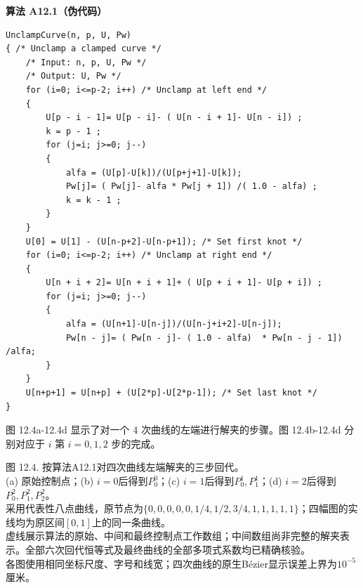 \documentclass[../main.tex]{subfiles}
\begin{document}
\par\medskip\noindent\textbf{算法 A12.1（伪代码）}\par
\begin{verbatim}
UnclampCurve(n, p, U, Pw)
{ /* Unclamp a clamped curve */
    /* Input: n, p, U, Pw */
    /* Output: U, Pw */
    for (i=0; i<=p-2; i++) /* Unclamp at left end */
    {
        U[p - i - 1]= U[p - i]- ( U[n - i + 1]- U[n - i]) ;
        k = p - 1 ;
        for (j=i; j>=0; j--)
        {
            alfa = (U[p]-U[k])/(U[p+j+1]-U[k]);
            Pw[j]= ( Pw[j]- alfa * Pw[j + 1]) /( 1.0 - alfa) ;
            k = k - 1 ;
        }
    }
    U[0] = U[1] - (U[n-p+2]-U[n-p+1]); /* Set first knot */
    for (i=0; i<=p-2; i++) /* Unclamp at right end */
    {
        U[n + i + 2]= U[n + i + 1]+ ( U[p + i + 1]- U[p + i]) ;
        for (j=i; j>=0; j--)
        {
            alfa = (U[n+1]-U[n-j])/(U[n-j+i+2]-U[n-j]);
            Pw[n - j]= ( Pw[n - j]- ( 1.0 - alfa)  * Pw[n - j - 1]) /alfa;
        }
    }
    U[n+p+1] = U[n+p] + (U[2*p]-U[2*p-1]); /* Set last knot */
}
\end{verbatim}

图 12.4a-12.4d 显示了对一个 4 次曲线的左端进行解夹的步骤。图 12.4b-12.4d 分别对应于 \(i\) 第 \(i = 0,1,2\) 步的完成。

\begin{center}
\begin{minipage}{37cm}
\centering
{}
\par\medskip
{}
\par\medskip
{}
\par\smallskip
图 12.4. 按算法A12.1对四次曲线左端解夹的三步回代。\\
(a) 原始控制点；(b) $i=0$后得到$P_0^0$；(c) $i=1$后得到$P_0^1,P_1^1$；(d) $i=2$后得到$P_0^2,P_1^2,P_2^2$。\\
采用代表性八点曲线，原节点为$\{0,0,0,0,0,1/4,1/2,3/4,1,1,1,1,1\}$；四幅图的实线均为原区间$[0,1]$上的同一条曲线。\\
虚线展示算法的原始、中间和最终控制点工作数组；中间数组尚非完整的解夹表示。全部六次回代恒等式及最终曲线的全部多项式系数均已精确核验。\\
各图使用相同坐标尺度、字号和线宽；四次曲线的原生B\'{e}zier显示误差上界为$10^{-5}$厘米。
\end{minipage}
\end{center}
\end{document}
